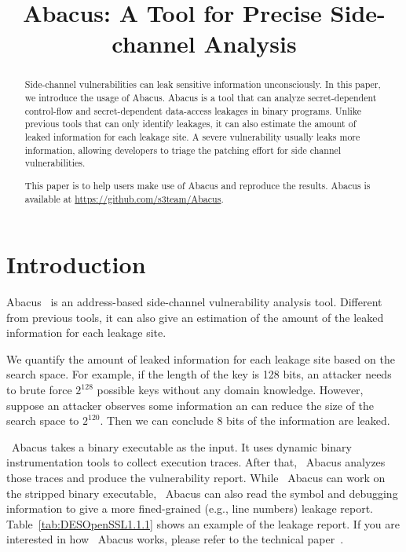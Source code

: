 \documentclass[10pt,conference]{IEEEtran}
\newcommand{\tool}{\textsf{Abacus}}
\begin{document}
\title{\tool{}: A Tool for Precise Side-channel Analysis}
\author{
}


\maketitle

\begin{abstract}
Side-channel vulnerabilities can leak sensitive information unconsciously. 
In this paper, we introduce the usage of Abacus. Abacus is a tool that can analyze secret-dependent control-flow and secret-dependent data-access leakages in binary programs. Unlike previous tools that can only identify leakages, it can also estimate the amount of leaked information for each leakage site. A severe vulnerability usually leaks more information, allowing developers to triage the patching effort for side channel vulnerabilities.

This paper is to help users make use of Abacus and reproduce the
results. Abacus is available at \url{https://github.com/s3team/Abacus}.
\end{abstract}

\IEEEpeerreviewmaketitle
{}
\pagestyle{plain}
\section{Introduction}


Abacus~\cite{bao2021abacus} is an address-based side-channel vulnerability analysis tool. Different from previous tools, it can also give an estimation of the amount of the leaked information for each leakage site.

We quantify the amount of leaked information for each leakage site based on the search space. For example, if the length of the key is 128 bits, an attacker needs to brute force $2^{128}$ possible keys without any domain knowledge. However, suppose an attacker observes some information an can reduce the size of the search space to $2^{120}$. Then we can conclude 8 bits of the information are leaked.

~\tool{} takes a binary executable as the input. It uses dynamic binary instrumentation tools to collect execution traces. After that, ~\tool{} analyzes those traces and produce the vulnerability report. While ~\tool{} can work on the stripped binary executable, ~\tool{} can also read the symbol and debugging information to give a more fined-grained (e.g., line numbers) leakage report. Table~\ref{tab:DESOpenSSL1.1.1} shows an example of the leakage report. If you are interested in how ~\tool{} works, please refer to the technical paper~\cite{bao2021abacus}.
\end{document}
